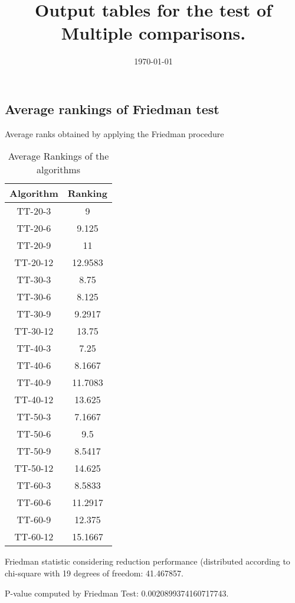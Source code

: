 \documentclass[a4paper,10pt]{article}
\title{Output tables for the test of Multiple comparisons.}
\author{}
\date{\today}
\begin{document}
\begin{landscape}
\pagestyle{empty}
\maketitle
\thispagestyle{empty}
\section{Average rankings of Friedman test}



Average ranks obtained by applying the Friedman procedure

\begin{table}[!htp]
\centering
\begin{tabular}{|c|c|}\hline
Algorithm&Ranking\\\hline
TT-20-3 & 9\\
TT-20-6 & 9.125\\
TT-20-9 & 11\\
TT-20-12 & 12.9583\\
TT-30-3 & 8.75\\
TT-30-6 & 8.125\\
TT-30-9 & 9.2917\\
TT-30-12 & 13.75\\
TT-40-3 & 7.25\\
TT-40-6 & 8.1667\\
TT-40-9 & 11.7083\\
TT-40-12 & 13.625\\
TT-50-3 & 7.1667\\
TT-50-6 & 9.5\\
TT-50-9 & 8.5417\\
TT-50-12 & 14.625\\
TT-60-3 & 8.5833\\
TT-60-6 & 11.2917\\
TT-60-9 & 12.375\\
TT-60-12 & 15.1667\\
\hline
\end{tabular}
\caption{Average Rankings of the algorithms}
\end{table}

Friedman statistic considering reduction performance (distributed according to chi-square with 19 degrees of freedom: 41.467857.

P-value computed by Friedman Test: 0.0020899374160717743.\newline



\pagebreak


\end{landscape}
\end{document}
